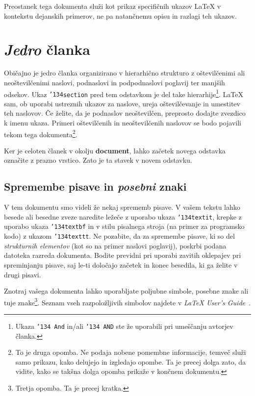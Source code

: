 \documentclass[article,slovene]{stucosrec}
\newcommand{\latex}{\LaTeX\xspace}
\begin{document}
	Preostanek tega dokumenta služi kot prikaz specifičnih ukazov \latex v kontekstu dejanskih primerov, ne pa natančnemu opisu in razlagi teh ukazov.
	
	\section{\textit{Jedro} članka}
	
	Običajno je jedro članka organizirano v hierarhično strukturo z oštevilčenimi ali neoštevilčenimi naslovi, podnaslovi in podpodnaslovi poglavij ter manjših odsekov.
	Ukaz \texttt{{\char'134}section} pred tem odstavkom je del take hierarhije\footnote{Ukaza {\texttt{\char'134 And}} in/ali {\texttt{\char'134 AND}} ste že uporabili pri umeščanju avtorjev članka.}. \latex sam, ob uporabi ustreznih ukazov za naslove, ureja oštevilčevanje in umestitev teh naslovov.
	Če želite, da je podnaslov neoštevilčen, preprosto dodajte zvezdico k imenu ukaza.
	Primeri oštevilčenih in neoštevilčenih naslovov se bodo pojavili tekom tega dokumenta\footnote{To je druga opomba. Ne podaja nobene pomembne informacije, temveč služi samo prikazu, kako delujejo in izgledajo opombe. Ta je precej dolga zato, da vidite, kako se takšna dolga opomba prikaže v končnem dokumentu.}.
	
	Ker je celoten članek v okolju \textbf{document}, lahko začetek novega odstavka označite z prazno vrstico. Zato je ta stavek v novem odstavku.
	
	\subsection{Spremembe pisave in \textit{posebni} znaki}
	
	V tem dokumentu smo videli že nekaj sprememb pisave.
	V vašem tekstu lahko besede ali besedne zveze naredite ležeče z uporabo ukaza \texttt{{\char'134}textit}, krepke z uporabo ukaza \texttt{{\char'134}textbf} in v stilu pisalnega stroja (na primer za programsko kodo) z ukazom \texttt{{\char'134}texttt}.
	Ne pozabite, da za spremembe pisave, ki so del \textit{strukturnih elementov} (kot so na primer naslovi poglavij), poskrbi podana datoteka razreda dokumenta. Bodite previdni pri uporabi zavitih oklepajev pri spreminjanju pisave, saj le-ti določajo začetek in konec besedila, ki ga želite v drugi pisavi.
	
	Znotraj vašega dokumenta lahko uporabljate poljubne simbole, posebne znake ali tuje znake\footnote{Tretja opomba. Ta je precej kratka.}. Seznam vseh razpoložljivih simbolov najdete v \textit{\latex User's Guide}~\cite{Lamport:LaTeX}.
	
\end{document}
